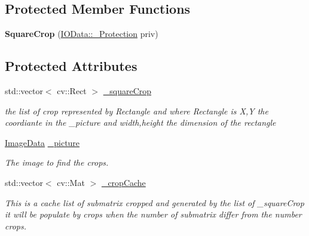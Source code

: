 \subsection*{Protected Member Functions}
\begin{DoxyCompactItemize}
\item 
\mbox{\label{classfilter_1_1data_1_1_square_crop_a4080c81615750c09cfe328e2ee6d6650}} 
{\bfseries Square\+Crop} (\hyperlink{classfilter_1_1data_1_1_i_o_data_1_1___protection}{I\+O\+Data\+::\+\_\+\+Protection} priv)
\end{DoxyCompactItemize}
\subsection*{Protected Attributes}
\begin{DoxyCompactItemize}
\item 
\mbox{\label{classfilter_1_1data_1_1_square_crop_a67bc98d8d4c0afb55f5c00be4d0c8ce0}} 
std\+::vector$<$ cv\+::\+Rect $>$ \hyperlink{classfilter_1_1data_1_1_square_crop_a67bc98d8d4c0afb55f5c00be4d0c8ce0}{\+\_\+square\+Crop}
\begin{DoxyCompactList}\small\item\em the list of crop represented by Rectangle and where Rectangle is X,Y the coordiante in the \+\_\+picture and width,height the dimension of the rectangle \end{DoxyCompactList}\item 
\mbox{\label{classfilter_1_1data_1_1_square_crop_a8981b1d69a0bee1cee55f8ec2f15e0b2}} 
\hyperlink{classfilter_1_1data_1_1_image_data}{Image\+Data} \hyperlink{classfilter_1_1data_1_1_square_crop_a8981b1d69a0bee1cee55f8ec2f15e0b2}{\+\_\+picture}
\begin{DoxyCompactList}\small\item\em The image to find the crops. \end{DoxyCompactList}\item 
\mbox{\label{classfilter_1_1data_1_1_square_crop_a3824caa3a560ec08ebd8f96d0a6c3abc}} 
std\+::vector$<$ cv\+::\+Mat $>$ \hyperlink{classfilter_1_1data_1_1_square_crop_a3824caa3a560ec08ebd8f96d0a6c3abc}{\+\_\+crop\+Cache}
\begin{DoxyCompactList}\small\item\em This is a cache list of submatrix cropped and generated by the list of \+\_\+square\+Crop it will be populate by crops when the number of submatrix differ from the number crops. \end{DoxyCompactList}\end{DoxyCompactItemize}
